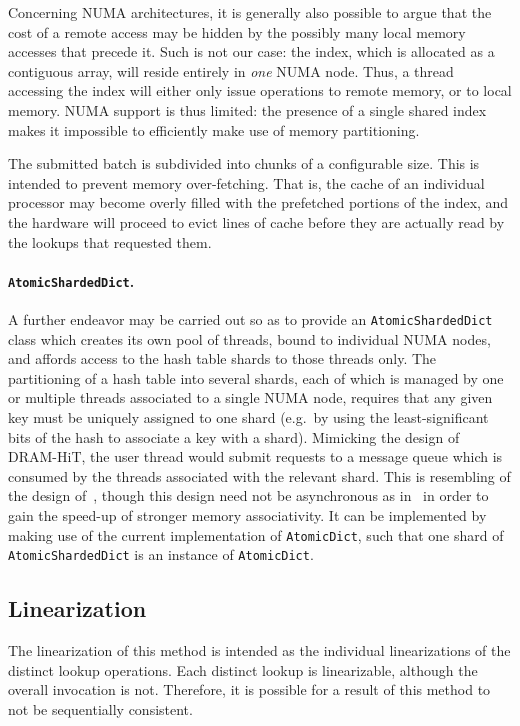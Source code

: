 Concerning NUMA architectures, it is generally also possible to argue that the cost of a remote access may be hidden by the possibly many local memory accesses that precede it.
Such is not our case: the index, which is allocated as a contiguous array, will reside entirely in \emph{one} NUMA node.
Thus, a thread accessing the index will either only issue operations to remote memory, or to local memory.
NUMA support is thus limited: the presence of a single shared index makes it impossible to efficiently make use of memory partitioning.

The submitted batch is subdivided into chunks of a configurable size.
This is intended to prevent memory over-fetching.
That is, the cache of an individual processor may become overly filled with the prefetched portions of the index, and the hardware will proceed to evict lines of cache before they are actually read by the lookups that requested them.

\paragraph{\texttt{AtomicShardedDict}.}
A further endeavor may be carried out so as to provide an \texttt{AtomicShardedDict} class which creates its own pool of threads, bound to individual NUMA nodes, and affords access to the hash table shards to those threads only.
The partitioning of a hash table into several shards, each of which is managed by one or multiple threads associated to a single NUMA node, requires that any given key must be uniquely assigned to one shard (e.g.\ by using the least-significant bits of the hash to associate a key with a shard).
Mimicking the design of DRAM-HiT, the user thread would submit requests to a message queue which is consumed by the threads associated with the relevant shard.
This is resembling of the design of~\cite{dramhit}, though this design need not be asynchronous as in~\cite{dramhit} in order to gain the speed-up of stronger memory associativity.
It can be implemented by making use of the current implementation of \texttt{AtomicDict}, such that one shard of \texttt{AtomicShardedDict} is an instance of \texttt{AtomicDict}.


\subsection{Linearization}\label{subsec:batch-lookup-linearization}

The linearization of this method is intended as the individual linearizations of the distinct lookup operations.
Each distinct lookup is linearizable, although the overall invocation is not.
Therefore, it is possible for a result of this method to not be sequentially consistent.


